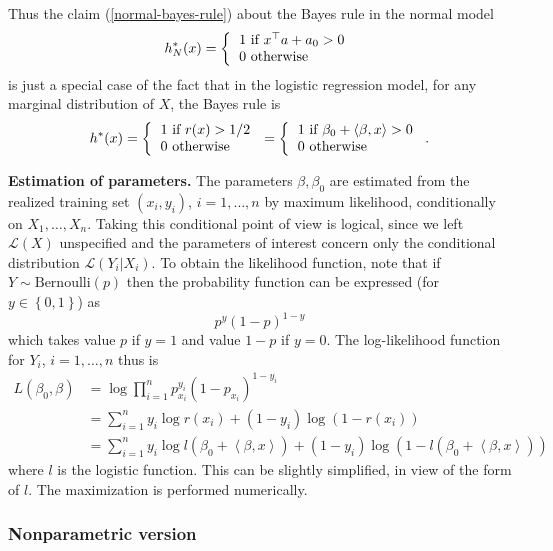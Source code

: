 \documentclass[11pt,twoside]{article}%
\theoremstyle{change}
\begin{document}
\bigskip\bigskip Thus the claim (\ref{normal-bayes-rule}) about the Bayes rule
in the normal model
\[
h_{N}^{\ast}(x)=\left\{
\begin{tabular}
[c]{l}%
$1$ if $x^{\top}a+a_{0}>0$\\
$0$ otherwise
\end{tabular}
\right.
\]
is just a special case of the fact that in the logistic regression model, for
any marginal distribution of $X$, the Bayes rule is
\[
h^{\ast}(x)=\left\{
\begin{tabular}
[c]{l}%
$1$ if $r(x)>1/2$\\
$0$ otherwise
\end{tabular}
\right.  =\left\{
\begin{tabular}
[c]{l}%
$1$ if $\beta_{0}+\left\langle \beta,x\right\rangle >0$\\
$0$ otherwise
\end{tabular}
\right.  .
\]


\bigskip\bigskip\textbf{Estimation of parameters.} The parameters $\beta
,\beta_{0}$ are estimated from the realized training set $\left(  x_{i}%
,y_{i}\right)  $, $i=1,\ldots,n$ by maximum likelihood, conditionally on
$X_{1},\ldots,X_{n}$. Taking this conditional point of view is logical, since
we left $\mathcal{L}(X)$ unspecified and the parameters of interest concern
only the conditional distribution $\mathcal{L}(Y_{i}|X_{i})$. To obtain the
likelihood function, note that if $Y\sim\mathrm{Bernoulli}\left(  p\right)  $
then the probability function can be expressed (for $y\in\left\{  0,1\right\}
$) as
\[
p^{y}(1-p)^{1-y}%
\]
which takes value $p$ if $y=1$ and value $1-p$ if $y=0$. The log-likelihood
function for $Y_{i}$, $i=1,\ldots,n$ thus is
\begin{align*}
L(\beta_{0},\beta)  & =\log%
{\displaystyle\prod\limits_{i=1}^{n}}
p_{x_{i}}^{y_{i}}\left(  1-p_{x_{i}}\right)  ^{1-y_{i}}\\
& =\sum_{i=1}^{n}y_{i}\log r(x_{i})+\left(  1-y_{i}\right)  \log\left(
1-r(x_{i})\right) \\
& =\sum_{i=1}^{n}y_{i}\log l(\beta_{0}+\left\langle \beta,x\right\rangle
)+\left(  1-y_{i}\right)  \log\left(  1-l(\beta_{0}+\left\langle
\beta,x\right\rangle )\right)
\end{align*}
where $l$ is the logistic function. This can be slightly simplified, in view
of the form of $l.$ The maximization is performed numerically.

\subsubsection{Nonparametric version}
\end{document}
